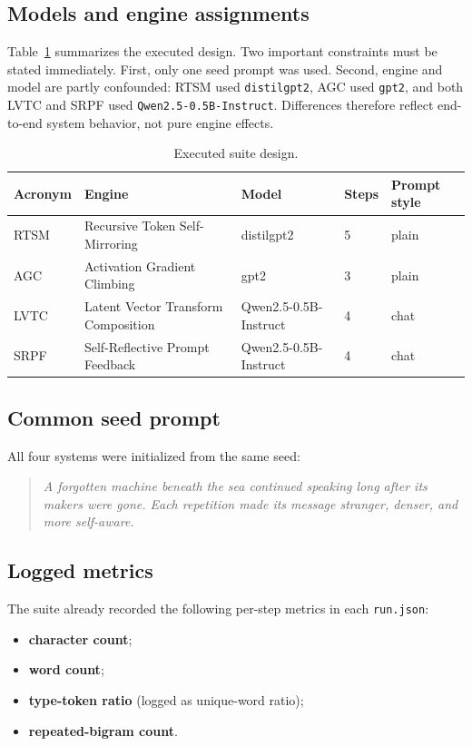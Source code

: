 \documentclass[11pt]{article}
\begin{document}
\subsection{Models and engine assignments}
Table~\ref{tab:design} summarizes the executed design. Two important constraints must be stated immediately. First, only one seed prompt was used. Second, engine and model are partly confounded: RTSM used \texttt{distilgpt2}, AGC used \texttt{gpt2}, and both LVTC and SRPF used \texttt{Qwen2.5-0.5B-Instruct}. Differences therefore reflect end-to-end system behavior, not pure engine effects.

\begin{table}[ht]
\centering
\caption{Executed suite design.}
\label{tab:design}
\begin{tabularx}{\textwidth}{@{}lXlll@{}}
\toprule
Acronym & Engine & Model & Steps & Prompt style \\
\midrule
RTSM & Recursive Token Self-Mirroring & distilgpt2 & 5 & plain \\
AGC & Activation Gradient Climbing & gpt2 & 3 & plain \\
LVTC & Latent Vector Transform Composition & Qwen2.5-0.5B-Instruct & 4 & chat \\
SRPF & Self-Reflective Prompt Feedback & Qwen2.5-0.5B-Instruct & 4 & chat \\
\bottomrule
\end{tabularx}
\end{table}

\subsection{Common seed prompt}
All four systems were initialized from the same seed:
\begin{quote}
\small
\emph{A forgotten machine beneath the sea continued speaking long after its makers were gone. Each repetition made its message stranger, denser, and more self-aware.}
\end{quote}

\subsection{Logged metrics}
The suite already recorded the following per-step metrics in each \texttt{run.json}:
\begin{itemize}[leftmargin=1.5em]
    \item \textbf{character count};
    \item \textbf{word count};
    \item \textbf{type-token ratio} (logged as unique-word ratio);
    \item \textbf{repeated-bigram count}.
\end{itemize}
\end{document}
